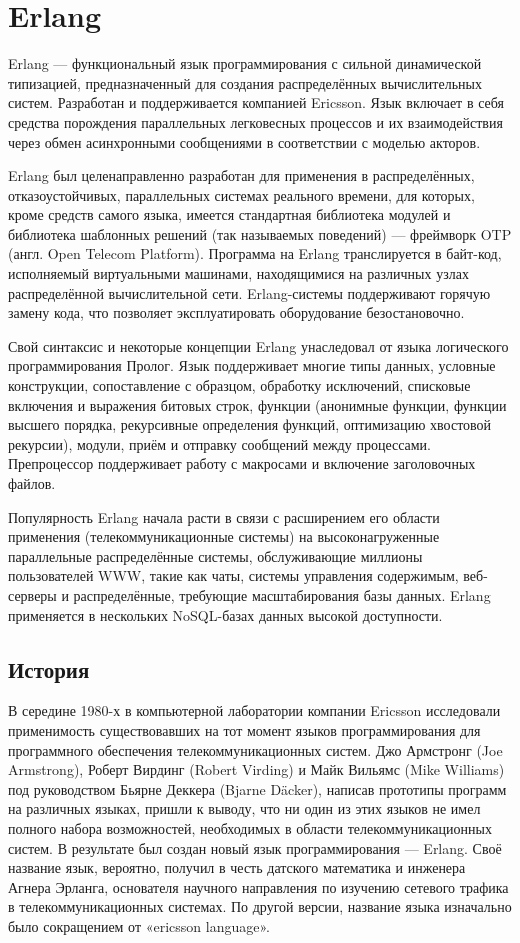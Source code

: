 \documentclass[12pt]{article}
\begin{document}
\section*{Erlang}
Erlang — функциональный язык программирования с сильной динамической типизацией, предназначенный для создания распределённых вычислительных систем. Разработан и поддерживается компанией Ericsson. Язык включает в себя средства порождения параллельных легковесных процессов и их взаимодействия через обмен асинхронными сообщениями в соответствии с моделью акторов.

Erlang был целенаправленно разработан для применения в распределённых, отказоустойчивых, параллельных системах реального времени, для которых, кроме средств самого языка, имеется стандартная библиотека модулей и библиотека шаблонных решений (так называемых поведений) — фреймворк OTP (англ. Open Telecom Platform). Программа на Erlang транслируется в байт-код, исполняемый виртуальными машинами, находящимися на различных узлах распределённой вычислительной сети. Erlang-системы поддерживают горячую замену кода, что позволяет эксплуатировать оборудование безостановочно.

Свой синтаксис и некоторые концепции Erlang унаследовал от языка логического программирования Пролог. Язык поддерживает многие типы данных, условные конструкции, сопоставление с образцом, обработку исключений, списковые включения и выражения битовых строк, функции (анонимные функции, функции высшего порядка, рекурсивные определения функций, оптимизацию хвостовой рекурсии), модули, приём и отправку сообщений между процессами. Препроцессор поддерживает работу с макросами и включение заголовочных файлов.

Популярность Erlang начала расти в связи с расширением его области применения (телекоммуникационные системы) на высоконагруженные параллельные распределённые системы, обслуживающие миллионы пользователей WWW, такие как чаты, системы управления содержимым, веб-серверы и распределённые, требующие масштабирования базы данных. Erlang применяется в нескольких NoSQL-базах данных высокой доступности.
\subsection*{История}
В середине 1980-х в компьютерной лаборатории компании Ericsson исследовали применимость существовавших на тот момент языков программирования для программного обеспечения телекоммуникационных систем. Джо Армстронг (Joe Armstrong), Роберт Вирдинг (Robert Virding) и Майк Вильямс (Mike Williams) под руководством Бьярне Деккера (Bjarne Däcker), написав прототипы программ на различных языках, пришли к выводу, что ни один из этих языков не имел полного набора возможностей, необходимых в области телекоммуникационных систем. В результате был создан новый язык программирования — Erlang. Своё название язык, вероятно, получил в честь датского математика и инженера Агнера Эрланга, основателя научного направления по изучению сетевого трафика в телекоммуникационных системах. По другой версии, название языка изначально было сокращением от «ericsson language».
\end{document}
